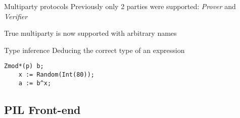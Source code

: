 \documentclass{beamer}
\begin{document}
\begin{frame}{Multiparty protocols}
  Previously only 2 parties were supported: \emph{Prover} and \emph{Verifier}
  
  \vfill

  \begin{center}
  \end{center}

  \vfill

  True multiparty is now supported with arbitrary names

  \vfill

  \begin{center}
  \end{center}
\end{frame}

\begin{frame}[fragile]{Type inference}
  Deducing the correct type of an expression

  \begin{lstlisting}[language=PIL]
    Zmod*(p) b;
    x := Random(Int(80));
    a := b^x;
  \end{lstlisting}  
\end{frame}

\subsection{PIL Front-end}
\end{document}
